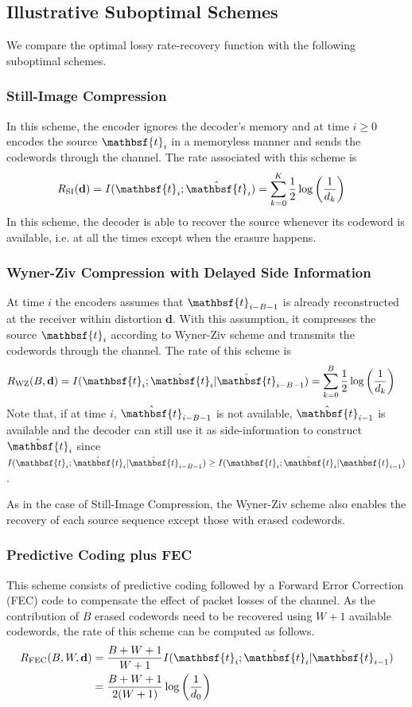 \documentclass[journal, twocolumn, 10pt]{IEEEtran}
\newcommand{\bd}{{\mathbf{d}}}
\newcommand{\rvbt}{{\mathbsf{t}}}
\begin{document}
{\subsection{Illustrative Suboptimal Schemes}
\label{subsec:Comparison}
We compare the optimal lossy rate-recovery function with  the following suboptimal schemes. 
\subsubsection{Still-Image Compression} In this scheme, the encoder ignores the decoder's memory and at time $i\ge 0$ encodes the source $\rvbt_{i}$  in a memoryless manner and sends the codewords through the channel. The rate associated with this scheme is 
\begin{align}
R_{\textrm{SI}}(\bd)&=I(\rvbt_{i};\hat{\rvbt}_{i})=\sum_{k=0}^{K}\frac{1}{2}\log \bigg(\frac{1}{d_{k}}\bigg)
\end{align} In this scheme, the decoder is able to recover the source whenever its codeword is available, i.e. at all the times except when the erasure happens.   
\subsubsection{Wyner-Ziv Compression with Delayed Side Information} At time $i$ the encoders assumes that $\rvbt_{i-B-1}$ is already reconstructed at the receiver within distortion $\bd$. With this assumption, it compresses the source $\rvbt_{i}$ according to Wyner-Ziv scheme and transmits the codewords through the channel. The rate of this scheme is 
\begin{align}
R_{\textrm{WZ}}(B,\bd)&=I(\rvbt_{i};\hat{\rvbt}_{i}|\hat{\rvbt}_{i-B-1})=\sum_{k=0}^{B}\frac{1}{2}\log \bigg(\frac{1}{d_{k}}\bigg)
\end{align} Note that, if at time $i$, $\hat{\rvbt}_{i-B-1}$ is not available, $\hat{\rvbt}_{i-1}$ is available and the decoder can still use it as side-information to construct $\hat{\rvbt}_{i}$ since $I(\rvbt_{i};\hat{\rvbt}_{i}|\hat{\rvbt}_{i-B-1})\ge I(\rvbt_{i};\hat{\rvbt}_{i}|\hat{\rvbt}_{i-1})$. 

As in the case of Still-Image Compression, the Wyner-Ziv scheme also enables the recovery of each source sequence except those with erased codewords. 


\subsubsection{Predictive Coding plus FEC} This scheme consists of predictive coding followed by a Forward Error Correction (FEC) code to compensate the effect of packet losses of the channel. As the contribution of $B$ erased codewords need to be recovered using $W+1$ available codewords, the rate of this scheme can be computed as follows. 
\begin{align}
R_{\textrm{FEC}}(B,W,\bd)&=\frac{B+W+1}{W+1}I(\rvbt_{i};\hat{\rvbt}_{i}|\hat{\rvbt}_{i-1})\\&=\frac{B+W+1}{2(W+1)}\log \bigg(\frac{1}{d_{0}}\bigg)
\end{align} 

}
\end{document}
